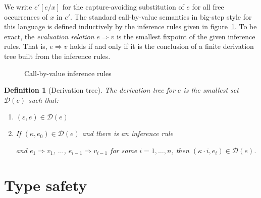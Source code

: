 \documentclass[12pt,a2paper,draft]{article}
\newcommand{\abstr}[2]{\ensuremath{\lambda{#1}.\,{#2}}}
\newcommand{\app}[2]{\ensuremath{{#1}\,{#2}}}
\newcommand{\rec}[2]{\ensuremath{{\normalfont\textsf{rec}}\,{#1}.\,{#2}}}
\newcommand{\tree}[1]{\mathcal{D}(#1)}
\newtheorem{definition}{Definition}
\begin{document}
We write $e'[e/x]$ for the capture-avoiding substitution of $e$ for all free occurrences
of $x$ in $e'$. The standard call-by-value semantics in big-step style for this language is
defined inductively by the inference rules given in figure~\ref{figure:Call_by_value_inference_rules}.
To be exact, the \emph{evaluation relation} $e \Rightarrow v$ is the smallest fixpoint of
the given inference rules. That is, $e \Rightarrow v$ holds if and only if it is the conclusion
of a finite derivation tree built from the inference rules.

\begin{figure}[htb]
  \centering
  \caption{Call-by-value inference rules}
  \label{figure:Call_by_value_inference_rules}
\end{figure}

\begin{definition}[Derivation tree] \label{definition:Derivation_tree}
  The \emph{derivation tree} for $e$ is the smallest set $\tree{e}$ such that:
  \begin{enumerate}
  \item $(\varepsilon, e) \in \tree{e}$
  \item If $(\kappa,e_0) \in \tree{e}$ and there is an inference rule
    \begin{mathpar}
    \end{mathpar}
    and $e_1 \Rightarrow v_1$, $\ldots$, $e_{i-1} \Rightarrow v_{i-1}$ for some $i = 1,\ldots,n$, then
    $(\kappa \cdot i,e_i) \in \tree{e}$.
  \end{enumerate}
\end{definition}


\section{Type safety}
\end{document}
